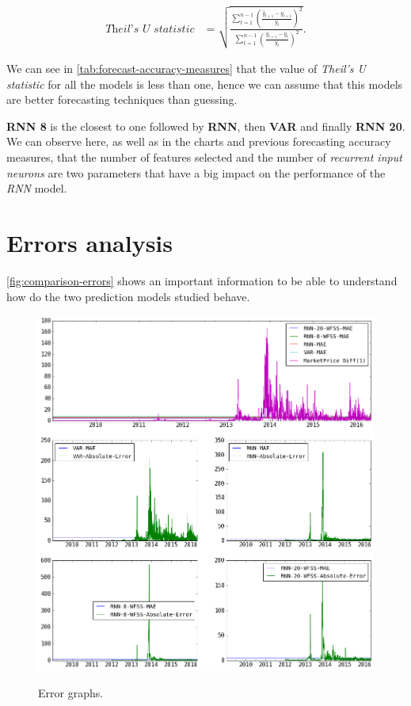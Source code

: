 \begin{equation}
  \begin{aligned}
    \label{eq:theils-u-statistic}
    \textit{Theil's U statistic} & = \sqrt{\frac {\displaystyle\sum_{t
          = 1}^{n - 1} \left( \frac{\hat{y}_{t+1} - y_{t+1}}{y_t}
        \right)^2} {\displaystyle\sum_{t = 1}^{n - 1} \left(
          \frac{y_{t+1} - y_t}{y_t} \right)^2}}.
  \end{aligned}
\end{equation}

We can see in \autoref{tab:forecast-accuracy-measures} that the value
of \textit{Theil's U statistic} for all the models is less than one,
hence we can assume that this models are better forecasting techniques
than guessing.

\textbf{RNN 8} is the closest to one followed by \textbf{RNN}, then
\textbf{VAR} and finally \textbf{RNN 20}. We can observe here, as well
as in the charts and previous forecasting accuracy measures, that the
number of features selected and the number of \textit{recurrent input
neurons} are two parameters that have a big impact on the performance
of the \textit{RNN} model.

\section{Errors analysis}
\label{sec:errors-analysis}

\autoref{fig:comparison-errors} shows an important information to be
able to understand how do the two prediction models studied behave.

\begin{figure}[bth]
  \myfloatalign
  {
    \includegraphics[width=1\linewidth]
    {gfx/comparison-errors}}
  \caption{Error graphs.}
  \label{fig:comparison-errors}
\end{figure}

